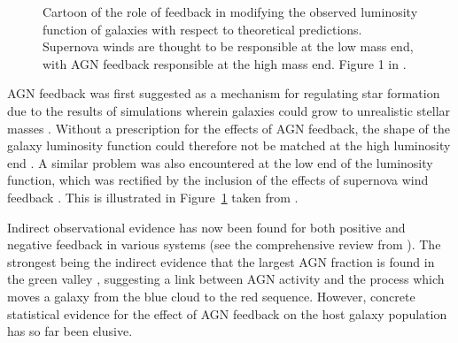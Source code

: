 \begin{figure}[t]
\caption[Illustration of the mismatch between theoretical and observed luminosity function from \cite{silk12}]{Cartoon of the role of feedback in modifying the observed luminosity function of galaxies with respect to theoretical predictions. Supernova winds are thought to be responsible at the low mass end, with AGN feedback responsible at the high mass end. Figure 1 in \cite{silk12}.}
\label{fig:lumfuncpic}
\end{figure}

AGN feedback was first suggested as a mechanism for regulating star formation due to the results of simulations wherein galaxies could grow to unrealistic stellar masses \citep{silk98, Bower06, Croton06, somerville08}. Without a prescription for the effects of AGN feedback, the shape of the galaxy luminosity function could therefore not be matched at the high luminosity end \citep{baugh98, baugh05, kauffmann99a, kauffmann99b, somerville01, kitzbichler06}. A similar problem was also encountered at the low end of the luminosity function, which was rectified by the inclusion of the effects of supernova wind feedback \citep{dekel86, powell11}. This is illustrated in Figure~\ref{fig:lumfuncpic} taken from \cite{silk12}. 

Indirect observational evidence has now been found for both positive and negative feedback in various systems (see the comprehensive review from \citealt{fabian12}). The strongest being the indirect evidence that the largest AGN fraction is found in the green valley \citep{cowie08, Hickox09, schawinski10a}, suggesting a link between AGN activity and the process which moves a galaxy from the blue cloud to the red sequence. However, concrete statistical evidence for the effect of AGN feedback on the host galaxy population has so far been elusive.


